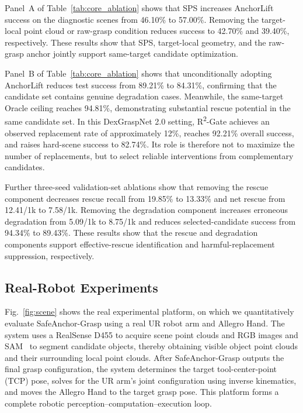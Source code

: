 \documentclass[lettersize,journal]{IEEEtran}
\begin{document}
Panel~A of Table~\ref{tab:core_ablation} shows that SPS increases AnchorLift success on the diagnostic scenes from 46.10\% to 57.00\%. Removing the target-local point cloud or raw-grasp condition reduces success to 42.70\% and 39.40\%, respectively. These results show that SPS, target-local geometry, and the raw-grasp anchor jointly support same-target candidate optimization.

Panel~B of Table~\ref{tab:core_ablation} shows that unconditionally adopting AnchorLift reduces test success from 89.21\% to 84.31\%, confirming that the candidate set contains genuine degradation cases. Meanwhile, the same-target Oracle ceiling reaches 94.81\%, demonstrating substantial rescue potential in the same candidate set. In this DexGraspNet 2.0 setting, R\textsuperscript{2}-Gate achieves an observed replacement rate of approximately 12\%, reaches 92.21\% overall success, and raises hard-scene success to 82.74\%. Its role is therefore not to maximize the number of replacements, but to select reliable interventions from complementary candidates.

Further three-seed validation-set ablations show that removing the rescue component decreases rescue recall from 19.85\% to 13.33\% and net rescue from 12.41/1k to 7.58/1k. Removing the degradation component increases erroneous degradation from 5.09/1k to 8.75/1k and reduces selected-candidate success from 94.34\% to 89.43\%. These results show that the rescue and degradation components support effective-rescue identification and harmful-replacement suppression, respectively.

\subsection{Real-Robot Experiments}

Fig.~\ref{fig:scene} shows the real experimental platform, on which we quantitatively evaluate SafeAnchor-Grasp using a real UR robot arm and Allegro Hand. The system uses a RealSense D455 to acquire scene point clouds and RGB images and SAM~\cite{ref35} to segment candidate objects, thereby obtaining visible object point clouds and their surrounding local point clouds. After SafeAnchor-Grasp outputs the final grasp configuration, the system determines the target tool-center-point (TCP) pose, solves for the UR arm's joint configuration using inverse kinematics, and moves the Allegro Hand to the target grasp pose. This platform forms a complete robotic perception--computation--execution loop.
\end{document}
